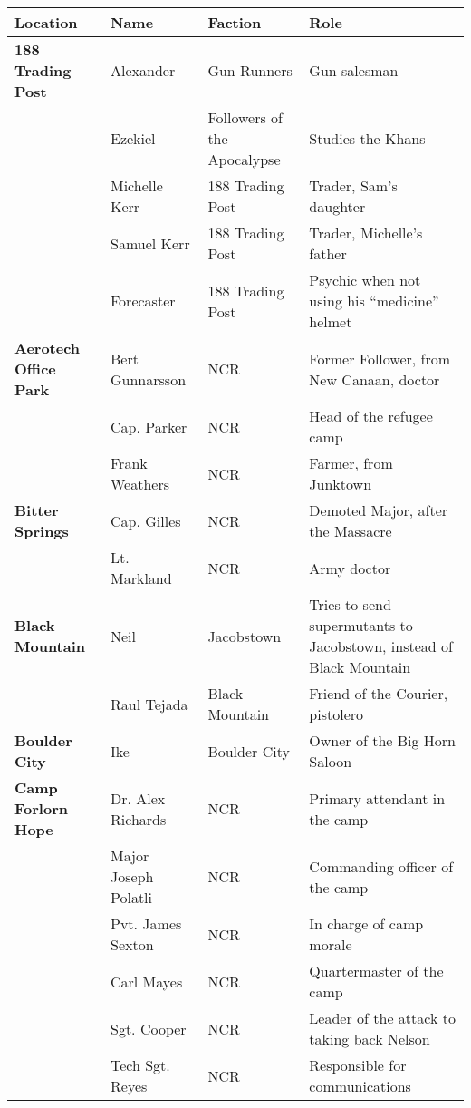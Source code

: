 
\begin{longtable}{|p{3cm}|p{3cm}|p{4cm}|p{8cm}|} 
\hline 
\bfseries Location & \bfseries Name & \bfseries Faction & \bfseries Role \\
\hline 
\endhead 
\bfseries 188 Trading Post & Alexander & Gun Runners & Gun salesman \\
\hfill & Ezekiel & Followers of the Apocalypse & Studies the Khans \\
\hfill & Michelle Kerr & 188 Trading Post & Trader, Sam's daughter \\
\hfill & Samuel Kerr & 188 Trading Post & Trader, Michelle's father \\
\hfill & Forecaster & 188 Trading Post & Psychic when not using his ``medicine'' helmet \\

\bfseries Aerotech Office Park & Bert Gunnarsson & NCR & Former Follower, from New Canaan, doctor \\
\hfill & Cap. Parker & NCR & Head of the refugee camp \\
\hfill & Frank Weathers & NCR & Farmer, from Junktown \\

\bfseries Bitter Springs & Cap. Gilles & NCR & Demoted Major, after the Massacre \\
\hfill & Lt. Markland & NCR & Army doctor \\

\bfseries Black Mountain & Neil & Jacobstown & Tries to send supermutants to Jacobstown, instead of Black Mountain \\
\hfill & Raul Tejada & Black Mountain & Friend of the Courier, pistolero \\

\bfseries Boulder City & Ike & Boulder City & Owner of the Big Horn Saloon \\

\bfseries Camp Forlorn Hope & Dr. Alex Richards & NCR & Primary attendant in the camp \\
\hfill & Major Joseph Polatli & NCR & Commanding officer of the camp \\
\hfill & Pvt. James Sexton & NCR & In charge of camp morale \\
\hfill & Carl Mayes & NCR & Quartermaster of the camp \\
\hfill & Sgt. Cooper & NCR & Leader of the attack to taking back Nelson \\
\hfill & Tech Sgt. Reyes & NCR & Responsible for communications \\


\end{longtable}
